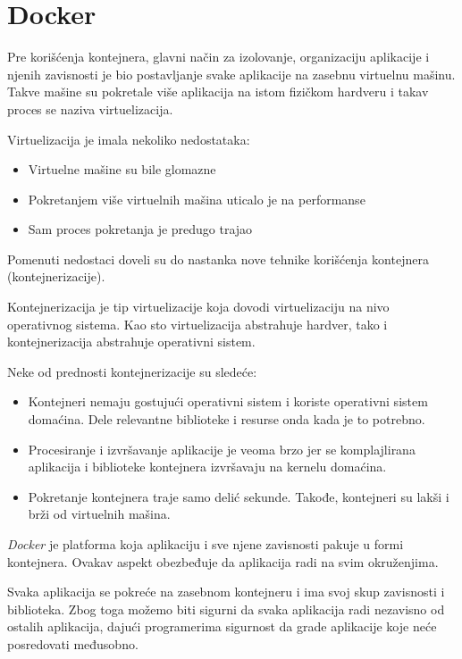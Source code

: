 \section{Docker}\label{sec:docker}

Pre korišćenja kontejnera, glavni način za izolovanje, organizaciju aplikacije i njenih zavisnosti je 
bio postavljanje svake aplikacije na zasebnu virtuelnu mašinu. Takve mašine su pokretale više aplikacija 
na istom fizičkom hardveru i takav proces se naziva virtuelizacija.

Virtuelizacija je imala nekoliko nedostataka: 
\begin{itemize}
    \item Virtuelne mašine su bile glomazne
    \item Pokretanjem više virtuelnih mašina uticalo je na performanse
    \item Sam proces pokretanja je predugo trajao
\end{itemize}

Pomenuti nedostaci doveli su do nastanka nove tehnike korišćenja kontejnera (kontejnerizacije). 

Kontejnerizacija je tip virtuelizacije koja dovodi virtuelizaciju na nivo operativnog 
sistema. Kao sto virtuelizacija abstrahuje hardver, tako i kontejnerizacija abstrahuje 
operativni sistem.

Neke od prednosti kontejnerizacije su sledeće:
\begin{itemize}
    \item Kontejneri nemaju gostujući operativni sistem i koriste operativni sistem domaćina. 
    Dele relevantne biblioteke i resurse onda kada je to potrebno.
    \item Procesiranje i izvršavanje aplikacije je veoma brzo jer se komplajlirana aplikacija 
    i biblioteke kontejnera izvršavaju na kernelu domaćina.
    \item Pokretanje kontejnera traje samo delić sekunde. Takođe, kontejneri su lakši i brži 
    od virtuelnih mašina.
\end{itemize}

\textit{Docker} je platforma koja aplikaciju i sve njene zavisnosti pakuje u formi kontejnera. 
Ovakav aspekt obezbeđuje da aplikacija radi na svim okruženjima.

Svaka aplikacija se pokreće na zasebnom kontejneru i ima svoj skup zavisnosti i biblioteka. 
Zbog toga možemo biti sigurni da svaka aplikacija radi nezavisno od ostalih aplikacija, 
dajući programerima sigurnost da grade aplikacije koje neće posredovati međusobno.

